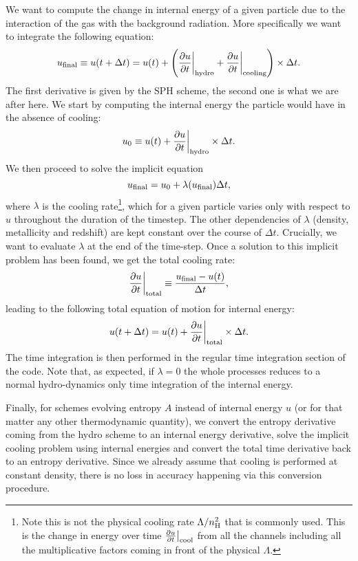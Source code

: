 \documentclass[fleqn, usenatbib, useAMS, a4paper]{mnras}
\begin{document}
We want to compute the change in internal energy of a given particle
due to the interaction of the gas with the background radiation. More
specifically we want to integrate the following equation:
\begin{equation}
  u_{\rm final} \equiv u(t+\Delta t) = u(t) + \left(\frac{\partial u}{\partial t}\bigg|_{\rm
    hydro} + \frac{\partial u}{\partial t}\bigg|_{\rm cooling}\right)
  \times \Delta t.
\end{equation}
The first derivative is given by the SPH scheme, the second one is
what we are after here. We start by computing the internal energy the
particle would have in the absence of cooling:
\begin{equation}
  u_0 \equiv u(t) + \frac{\partial u}{\partial t}\bigg|_{\rm
    hydro} \times \Delta t.
\end{equation}
We then proceed to solve the implicit equation
\begin{equation}\label{implicit-eq}
 u_{\rm final} = u_0 + \lambda(u_{\rm final}) \Delta t,
\end{equation}
where $\lambda$ is the cooling rate\footnote{Note this is not the
  physical cooling rate $\Lambda/n_{\rm H}^2$ that is commonly
  used. This is the change in energy over time $\frac{\partial
    u}{\partial t}\big|_{\rm cool}$ from all the channels
  including all the multiplicative factors coming in front of the
  physical $\Lambda$.}, which for a given particle varies
only with respect to $u$ throughout the duration of the timestep. The
other dependencies of $\lambda$ (density, metallicity and redshift)
are kept constant over the course of $\Delta t$. Crucially, we want to
evaluate $\lambda$ at the end of the time-step. Once a solution to this
implicit problem has been found, we get the total cooling rate:
\begin{equation}
  \frac{\partial u}{\partial t}\bigg|_{\rm total} \equiv \frac{u_{\rm final} -
    u(t)}{\Delta t},
\end{equation}
leading to the following total equation of motion for internal energy:
\begin{equation}
  u(t+\Delta t) = u(t) + \frac{\partial u}{\partial t}\bigg|_{\rm
    total} \times \Delta t.
\end{equation}
The time integration is then performed in the regular time integration
section of the code. Note that, as expected, if $\lambda=0$ the whole
processes reduces to a normal hydro-dynamics only time integration of
the internal energy.

Finally, for schemes evolving entropy $A$ instead of internal energy
$u$ (or for that matter any other thermodynamic quantity), we convert
the entropy derivative coming from the hydro scheme to an internal
energy derivative, solve the implicit cooling problem using internal
energies and convert the total time derivative back to an entropy
derivative. Since we already assume that cooling is performed at
constant density, there is no loss in accuracy happening via this
conversion procedure.
\end{document}
